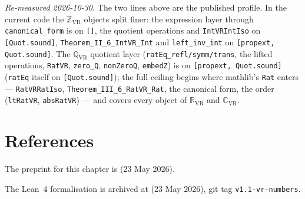 \emph{Re-measured 2026-10-30.}  The two lines above are the published profile.
In the current code the $\mathbb{Z}_{\mathrm{VR}}$ objects split finer: the expression
layer through \texttt{canonical\_form} is on \texttt{[]}, the quotient operations and
\texttt{IntVRIntIso} on \texttt{[Quot.sound]}, \texttt{Theorem\_II\_6\_IntVR\_Int} and
\texttt{left\_inv\_int} on \texttt{[propext, Quot.sound]}.  The
$\mathbb{Q}_{\mathrm{VR}}$ quotient layer (\texttt{ratEq\_refl/symm/trans}, the lifted
operations, \texttt{RatVR}, \texttt{zero\_Q}, \texttt{nonZeroQ}, \texttt{embedZ}) is on
\texttt{[propext, Quot.sound]} (\texttt{ratEq} itself on \texttt{[Quot.sound]}); the
full ceiling begins where mathlib's \texttt{Rat} enters --- \texttt{RatVRRatIso},
\texttt{Theorem\_III\_6\_RatVR\_Rat}, the canonical form, the order
(\texttt{ltRatVR}, \texttt{absRatVR}) --- and covers every object of
$\mathbb{R}_{\mathrm{VR}}$ and $\mathbb{C}_{\mathrm{VR}}$.

\section{References}
\label{sec:numbers_refs}

The preprint for this chapter is
 (23 May 2026).

The Lean~4 formalisation is archived at
 (23 May 2026),
git tag \texttt{v1.1-vr-numbers}.
